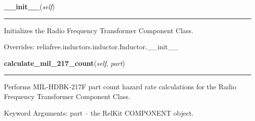 \hspace{.8\funcindent}\begin{boxedminipage}{\funcwidth}

    \raggedright \textbf{\_\_init\_\_}(\textit{self})

    \vspace{-1.5ex}

    \rule{\textwidth}{0.5\fboxrule}
\setlength{\parskip}{2ex}
    Initializes the Radio Frequency Transformer Component Class.

\setlength{\parskip}{1ex}
      Overrides: reliafree.inductors.inductor.Inductor.\_\_init\_\_

    \end{boxedminipage}

    \label{reliafree:inductors:transformer:RF:calculate_mil_217_count}

    \vspace{0.5ex}

\hspace{.8\funcindent}\begin{boxedminipage}{\funcwidth}

    \raggedright \textbf{calculate\_mil\_217\_count}(\textit{self}, \textit{part})

    \vspace{-1.5ex}

    \rule{\textwidth}{0.5\fboxrule}
\setlength{\parskip}{2ex}
    Performs MIL-HDBK-217F part count hazard rate calculations for the 
    Radio Frequency Transformer Component Class.

    Keyword Arguments: part -- the RelKit COMPONENT object.

\setlength{\parskip}{1ex}
    \end{boxedminipage}

    \label{reliafree:inductors:transformer:RF:calculate_mil_217_stress}

    \vspace{0.5ex}

